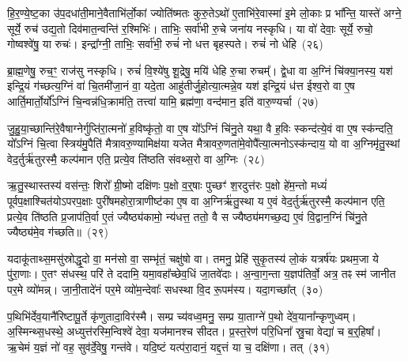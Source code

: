 हि॒र॒ण्ये॒ष्ट॒का उ॑प॒दधा॑ती॒माने॒वैताभि॑र्लो॒कां ज्योति॑ष्मतः कुरु॒ते\-ऽथो॑ ए॒ताभि॑रे॒वास्मा॑ इ॒मे लो॒काः प्र भा᳚न्ति॒ यास्ते॑ अग्ने॒ सूर्ये॒ रुच॑ उद्य॒तो दिव॑मात॒न्वन्ति॑ र॒श्मिभिः॑। ताभिः॒ सर्वा॑भी रु॒चे जना॑य नस्कृधि। या वो॑ देवाः॒ सूर्ये॒ रुचो॒ गोष्वश्वे॑षु॒ या रुचः॑। इन्द्रा᳚ग्नी॒ ताभिः॒ सर्वा॑भी॒ रुचं॑ नो धत्त बृहस्पते। रुचं॑ नो धेहि~(२६)

ब्रा॒ह्म॒णेषु॒ रुच॒ꣳ॒ राज॑सु नस्कृधि। रुचं॑ वि॒श्ये॑षु शू॒द्रेषु॒ मयि॑ धेहि रु॒चा रुचम्᳚। द्वे॒धा वा अ॒ग्निं चि॑क्या॒नस्य॒ यश॑ इन्द्रि॒यं ग॑च्छत्य॒ग्निं वा॑ चि॒तमी॑जा॒नं वा॒ यदे॒ता आहु॑तीर्जु॒होत्या॒त्मन्ने॒व यश॑ इन्द्रि॒यं ध॑त्त ईश्व॒रो वा ए॒ष आर्ति॒मार्तो॒र्यो᳚\-ऽग्निं चि॒न्वन्न॑धि॒क्राम॑ति॒ तत्त्वा॑ यामि॒ ब्रह्म॑णा॒ वन्द॑मान॒ इति॑ वारु॒ण्यर्चा~(२७)

जु॒हु॒या॒च्छान्ति॑रे॒वैषाग्नेर्गुप्ति॑रा॒त्मनो॑ ह॒विष्कृ॑तो॒ वा ए॒ष यो᳚\-ऽग्निं चि॑नु॒ते यथा॒ वै ह॒विः स्कन्द॑त्ये॒वं वा ए॒ष स्क॑न्दति॒ यो᳚\-ऽग्निं चि॒त्वा स्त्रिय॑मु॒पैति॑ मैत्रावरु॒ण्यामिक्ष॑या यजेत मैत्रावरु॒णता॑मे॒वोपै᳚त्या॒त्मनो\-ऽस्क॑न्दाय॒ यो वा अ॒ग्निमृ॑तु॒स्थां वेद॒र्तुर्\mbox{}ऋ॑तुरस्मै॒ कल्प॑मान एति॒ प्रत्ये॒व ति॑ष्ठति संवथ्स॒रो वा अ॒ग्निः~(२८)

ऋ॒तु॒स्थास्तस्य॑ वस॑न्तः॒ शिरो᳚ ग्री॒ष्मो दक्षि॑णः प॒क्षो व॒र्॒\mbox{}षाः पुच्छꣳ॑ श॒रदुत्त॑रः प॒क्षो हे॑म॒न्तो मध्यं॑ पूर्वप॒क्षाश्चित॑यो\-ऽपरप॒क्षाः पुरी॑षमहोरा॒त्राणीष्ट॑का ए॒ष वा अ॒ग्निर्\mbox{}ऋ॑तु॒स्था य ए॒वं वेद॒र्तुर्\mbox{}ऋ॑तुरस्मै॒ कल्प॑मान एति॒ प्रत्ये॒व ति॑ष्ठति प्र॒जा\-प॑ति॒र्वा ए॒तं ज्यैष्ठ्य॑कामो॒ न्य॑धत्त॒ ततो॒ वै स ज्यैष्ठ्य॑मगच्छ॒द्य ए॒वं वि॒द्वान॒ग्निं चि॑नु॒ते ज्यैष्ठ्य॑मे॒व ग॑च्छति॥~(२९)

{\anuvakamend[{पृ॒थि॒वीं य॑च्छ॒ यथ्स्व॑यमातृ॒ण्णा उ॑प॒धाय॑ धेह्यृ॒चाग्निश्चि॑नु॒ते त्रीणि॑ च}]}%

यदाकू॑ताथ्स॒मसु॑स्रोद्धृ॒दो वा॒ मन॑सो वा॒ सम्भृ॑तं॒ चक्षु॑षो वा। तमनु॒ प्रेहि॑ सुकृ॒तस्य॑ लो॒कं यत्रर्\mbox{}ष॑यः प्रथम॒जा ये पु॑रा॒णाः। ए॒तꣳ स॑धस्थ॒ परि॑ ते ददामि॒ यमा॒वहा᳚च्छेव॒धिं जा॒तवे॑दाः। अ॒न्वा॒ग॒न्ता य॒ज्ञप॑तिर्वो॒ अत्र॒ तꣴ स्म॑ जानीत पर॒मे व्यो॑मन्न्। जा॒नी॒तादे॑नं पर॒मे व्यो॑म॒न्देवाः᳚ सधस्था वि॒द रू॒पम॑स्य। यदा॒गच्छा᳚त्~(३०)

प॒थिभि॑र्देव॒यानै॑रिष्टापू॒र्ते कृ॑णुतादा॒विर॑स्मै। सम्प्र च्य॑वध्व॒मनु॒ सम्प्र या॒ताग्ने॑ प॒थो दे॑व॒याना᳚न्कृणुध्वम्। अ॒स्मिन्थ्स॒धस्थे॒ अध्युत्त॑रस्मि॒न्विश्वे॑ देवा॒ यज॑मानश्च सीदत। प्र॒स्त॒रेण॑ परि॒धिना᳚ स्रु॒चा वेद्या॑ च ब॒र्॒\mbox{}हिषा᳚। ऋ॒चेमं य॒ज्ञं नो॑ वह॒ सुव॑र्दे॒वेषु॒ गन्त॑वे। यदि॒ष्टं यत्प॑रा॒दानं॒ यद्द॒त्तं या च॒ दक्षि॑णा। तत्~(३१)


